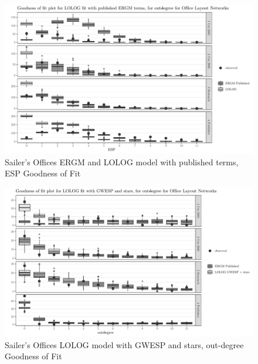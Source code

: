 \documentclass[
]{statsoc}
\begin{document}
\begin{figure}[H]

{\centering \includegraphics{lolog_catelog_writeup_JRSSA_major_revisions_git_files/figure-latex/unnamed-chunk-10-1} 

}

\caption{\label{fig:sailer_gof_pub_esp} Sailer's Offices ERGM and LOLOG model with published terms, ESP Goodness of Fit}\label{fig:unnamed-chunk-10}
\end{figure}

\begin{figure}[H]

{\centering \includegraphics{lolog_catelog_writeup_JRSSA_major_revisions_git_files/figure-latex/unnamed-chunk-11-1} 

}

\caption{\label{fig:sailer_gof_gwesp_star_odeg} Sailer's Offices LOLOG model with GWESP and stars, out-degree Goodness of Fit}\label{fig:unnamed-chunk-11}
\end{figure}
\end{document}
